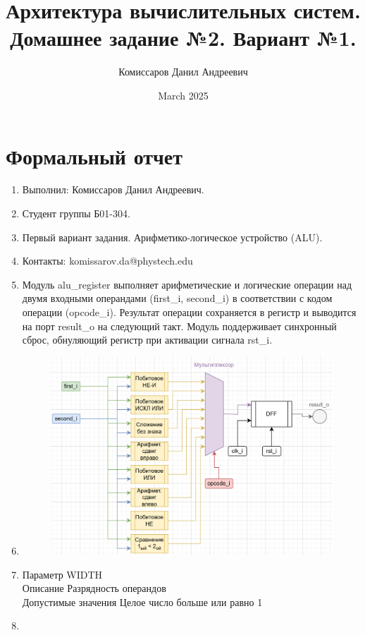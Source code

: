 \documentclass[a4paper,12pt]{article} %
\title{Архитектура вычислительных систем. Домашнее задание №2. Вариант №1.}
\author{Комиссаров Данил Андреевич}
\date{March 2025}
\begin{document}
\section{Формальный отчет}
\begin{enumerate}
    \item Выполнил: Комиссаров Данил Андреевич.
    \item Студент группы Б01-304.
    \item Первый вариант задания. Арифметико-логическое устройство (ALU).
    \item Контакты: komissarov.da@phystech.edu
    \item Модуль alu\_register выполняет арифметические и логические операции над двумя входными операндами (first\_i, second\_i) в соответствии с кодом операции (opcode\_i). Результат операции сохраняется в регистр и выводится на порт result\_o на следующий такт. Модуль поддерживает синхронный сброс, обнуляющий регистр при активации сигнала rst\_i.
    \item
\begin{figure}[H]
    \centering
    \includegraphics[width=1\linewidth]{Formal/АЛУ1.png}
\end{figure}
    \item
Параметр	WIDTH		\\
Описание	Разрядность операндов\\
Допустимые значения Целое число больше или равно 1\\
    \item
    \begin{table}[H]
\centering
\label{tab:ports}
\begin{tabular}{|l|c|l|p{6cm}|}
\hline

\end{tabular}
\end{table}
\end{enumerate}
\end{document}
